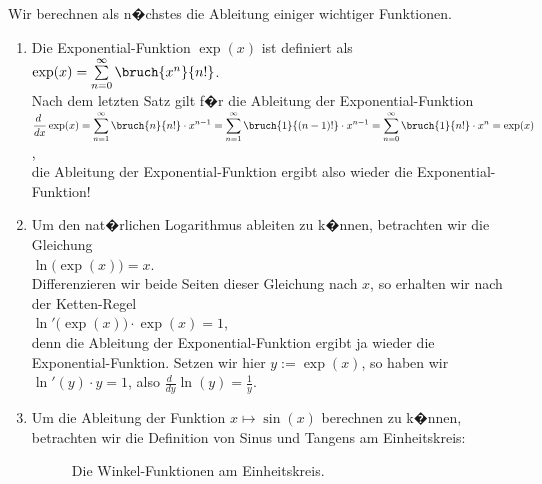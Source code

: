 Wir berechnen als n�chstes die Ableitung einiger wichtiger Funktionen.  
\begin{enumerate}
\item Die Exponential-Funktion $\exp(x)$ ist definiert als 
      \\[0.3cm]
      \hspace*{1.3cm}
      $\exp(x) = \sum\limits_{n=0}^\infty \bruch{x^n}{n!}$.
      \\[0.3cm]
      Nach dem letzten Satz gilt f�r die Ableitung der Exponential-Funktion 
      \\[0.3cm]
      \hspace*{1.3cm}
      $\displaystyle
         \frac{d\;}{dx}\exp(x) = \sum\limits_{n=1}^\infty \bruch{n}{n!} \cdot x^{n-1}
                             = \sum\limits_{n=1}^\infty \bruch{1}{(n-1)!} \cdot x^{n-1}
                             = \sum\limits_{n=0}^\infty \bruch{1}{n!} \cdot x^{n} = \exp(x)$,
      \\[0.3cm]
      die Ableitung der Exponential-Funktion ergibt also wieder die Exponential-Funktion!
\item Um den nat�rlichen Logarithmus ableiten zu k�nnen, betrachten wir die Gleichung 
      \\[0.3cm]
      \hspace*{1.3cm}
      $\ln\bigl(\exp(x)\bigr) = x$.
      \\[0.3cm]
      Differenzieren wir beide Seiten dieser Gleichung nach $x$, so erhalten wir nach der Ketten-Regel
      \\[0.3cm]
      \hspace*{1.3cm}
      $\displaystyle\ln'\bigl(\exp(x)\bigr)\cdot \exp(x) = 1$,
      \\[0.3cm]
      denn die Ableitung der Exponential-Funktion ergibt ja wieder die
      Exponential-Funktion.  Setzen wir hier $y:= \exp(x)$, so haben wir 
      \\[0.3cm]
      \hspace*{1.3cm}
      $\displaystyle\ln'(y) \cdot y = 1$, \quad also \quad
      $\displaystyle\frac{d\;}{dy}\ln(y) = \frac{1}{y}$.
\item Um die Ableitung der Funktion $x \mapsto \sin(x)$ berechnen zu k�nnen, 
      betrachten wir die Definition von  Sinus und Tangens am Einheitskreis:
      \begin{figure}[!h]
        \centering
        \caption{Die Winkel-Funktionen am Einheitskreis.}
        \label{fig:circle}
      \end{figure}

\end{enumerate}
